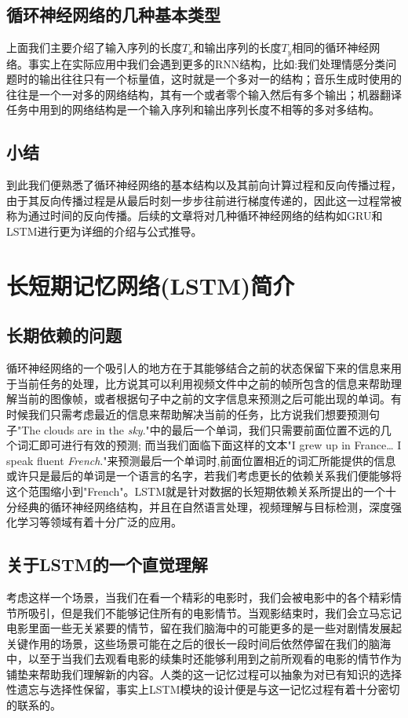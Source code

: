 \documentclass{ctexart}
\begin{document}
\subsection{循环神经网络的几种基本类型}
上面我们主要介绍了输入序列的长度$T_x$和输出序列的长度$T_y$相同的循环神经网络。事实上在实际应用中我们会遇到更多的RNN结构，比如:我们处理情感分类问题时的输出往往只有一个标量值，这时就是一个多对一的结构；音乐生成时使用的往往是一个一对多的网络结构，其有一个或者零个输入然后有多个输出；机器翻译任务中用到的网络结构是一个输入序列和输出序列长度不相等的多对多结构。
\subsection{小结}
到此我们便熟悉了循环神经网络的基本结构以及其前向计算过程和反向传播过程，由于其反向传播过程是从最后时刻一步步往前进行梯度传递的，因此这一过程常被称为通过时间的反向传播。后续的文章将对几种循环神经网络的结构如GRU和LSTM进行更为详细的介绍与公式推导。
\section{长短期记忆网络(LSTM)简介}
\subsection{长期依赖的问题}
循环神经网络的一个吸引人的地方在于其能够结合之前的状态保留下来的信息来用于当前任务的处理，比方说其可以利用视频文件中之前的帧所包含的信息来帮助理解当前的图像帧，或者根据句子中之前的文字信息来预测之后可能出现的单词。有时候我们只需考虑最近的信息来帮助解决当前的任务，比方说我们想要预测句子"The clouds are in the \textit{sky}."中的最后一个单词，我们只需要前面位置不远的几个词汇即可进行有效的预测; 而当我们面临下面这样的文本"I grew up in France… I speak fluent \textit{French}."来预测最后一个单词时,前面位置相近的词汇所能提供的信息或许只是最后的单词是一个语言的名字，若我们考虑更长的依赖关系我们便能够将这个范围缩小到"French"。LSTM就是针对数据的长短期依赖关系所提出的一个十分经典的循环神经网络结构，并且在自然语言处理，视频理解与目标检测，深度强化学习等领域有着十分广泛的应用。
\subsection{关于LSTM的一个直觉理解}
考虑这样一个场景，当我们在看一个精彩的电影时，我们会被电影中的各个精彩情节所吸引，但是我们不能够记住所有的电影情节。当观影结束时，我们会立马忘记电影里面一些无关紧要的情节，留在我们脑海中的可能更多的是一些对剧情发展起关键作用的场景，这些场景可能在之后的很长一段时间后依然停留在我们的脑海中，以至于当我们去观看电影的续集时还能够利用到之前所观看的电影的情节作为铺垫来帮助我们理解新的内容。人类的这一记忆过程可以抽象为对已有知识的选择性遗忘与选择性保留，事实上LSTM模块的设计便是与这一记忆过程有着十分密切的联系的。
\end{document}
